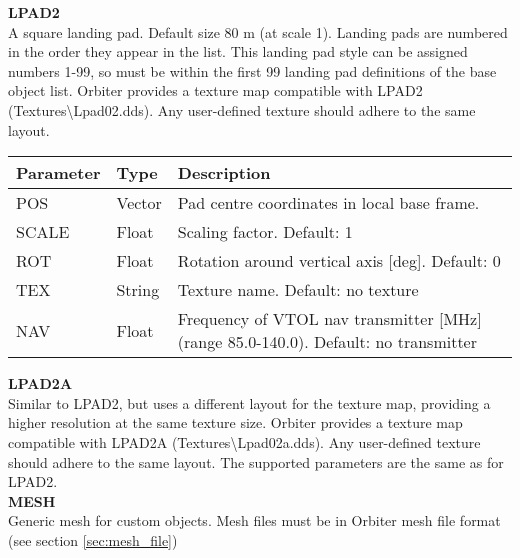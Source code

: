 \documentclass[Orbiter Developer Manual.tex]{subfiles}
\begin{document}
\noindent
\textbf{LPAD2}\\
A square landing pad. Default size 80 m (at scale 1). Landing pads are numbered in the order they appear in the list. This landing pad style can be assigned numbers 1-99, so must be within the first 99 landing pad definitions of the base object list. Orbiter provides a texture map compatible with LPAD2 (Textures\textbackslash Lpad02.dds). Any user-defined texture should adhere to the same layout.

	\begin{longtable}{ |p{}|p{}|p{}| }
	\hline\rule{0pt}{2ex}
	\textbf{Parameter} & \textbf{Type} & \textbf{Description}\\
	\hline\rule{0pt}{2ex}
	POS & Vector & Pad centre coordinates in local base frame.\\
	\hline\rule{0pt}{2ex}
	SCALE & Float & Scaling factor. Default: 1\\
	\hline\rule{0pt}{2ex}
	ROT & Float & Rotation around vertical axis [deg]. Default: 0\\
	\hline\rule{0pt}{2ex}
	TEX & String & Texture name. Default: no texture\\
	\hline\rule{0pt}{2ex}
	NAV & Float & Frequency of VTOL nav transmitter [MHz] (range 85.0-140.0). Default: no transmitter\\
	\hline
	\end{longtable}

\noindent
\textbf{LPAD2A}\\
Similar to LPAD2, but uses a different layout for the texture map, providing a higher resolution at the same texture size. Orbiter provides a texture map compatible with LPAD2A (Textures\textbackslash Lpad02a.dds). Any user-defined texture should adhere to the same layout. The supported parameters are the same as for LPAD2.\\


\noindent
\textbf{MESH}\\
Generic mesh for custom objects. Mesh files must be in Orbiter mesh file format (see section \ref{sec:mesh_file})
\end{document}

